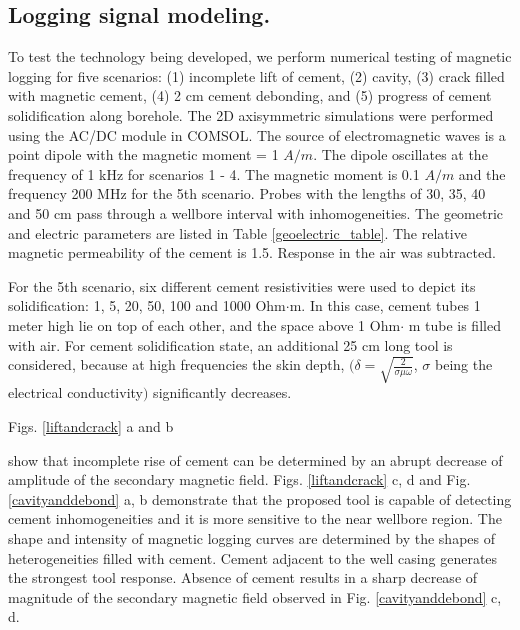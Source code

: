 \documentclass[10pt,twoside]{article}
\begin{document}
\subsection{Logging signal modeling.}

To test the technology being developed, we perform numerical testing of magnetic logging for five scenarios: (1) incomplete lift of cement, (2) cavity, (3) crack filled with magnetic cement, (4) 2 cm cement debonding, and (5) progress of cement solidification along borehole. The 2D axisymmetric simulations were performed using the AC/DC module in COMSOL. The source of electromagnetic waves is a point dipole with the magnetic moment = 1 $A/m$.  The dipole oscillates at the frequency of 1 kHz for scenarios 1 - 4. The magnetic moment is 0.1 $A/m${ and the frequency 200 MHz for the 5th scenario}. Probes with the lengths of 30, 35, 40 and 50 cm pass through a wellbore interval with inhomogeneities. The geometric and electric parameters are listed in Table \ref{geoelectric_table}. The relative magnetic permeability of the cement is 1.5. Response in the air was subtracted. {For the 5th scenario, six different cement resistivities were used to depict its solidification:  1, 5, 20, 50, 100 and 1000 Ohm$\cdot$m. In this case, cement tubes 1 meter high lie on top of each other, and the space above 1 Ohm$\cdot$ m tube is filled with air. For cement solidification state, an additional 25 cm long tool is considered, because at high frequencies the skin depth, $ \Big(  \delta = \sqrt{\frac{2}{\sigma\mu \omega}}$, $\sigma$ being the electrical conductivity$\Big)$ significantly decreases.

Figs. \ref{liftandcrack} a and b} show that incomplete rise of cement can be determined by an abrupt decrease of amplitude of the secondary magnetic field. Figs. \ref{liftandcrack} c, d and  Fig. \ref{cavityanddebond} a, b demonstrate that the proposed tool is capable of detecting cement inhomogeneities and it is more sensitive to the near wellbore region. The shape and intensity of magnetic logging curves are determined by the shapes of heterogeneities filled with cement. Cement adjacent to the well casing generates the strongest tool response. Absence of cement results in a sharp decrease of magnitude of the secondary magnetic field observed in Fig. \ref{cavityanddebond} c, d.
\end{document}
